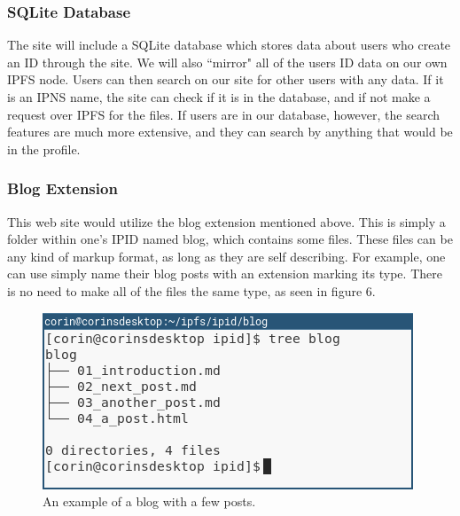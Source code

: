 \documentclass{article}
\begin{document}
\subsubsection{SQLite Database}

The site will include a SQLite database which stores data about users who create an ID through the site. We will also ``mirror" all of the users ID data on our own IPFS node. Users can then search on our site for other users with any data. If it is an IPNS name, the site can check if it is in the database, and if not make a request over IPFS for the files. If users are in our database, however, the search features are much more extensive, and they can search by anything that would be in the profile. 

\subsubsection{Blog Extension}

This web site would utilize the blog extension mentioned above. This is simply a folder within one's IPID named blog, which contains some files. These files can be any kind of markup format, as long as they are self describing. For example, one can use simply name their blog posts with an extension marking its type. There is no need to make all of the files the same type, as seen in figure 6. 

\begin{figure}[h]
  \centering
  \includegraphics[width=.75\linewidth]{resources/blog_example.png}
  \caption{An example of a blog with a few posts.}
\end{figure}
\end{document}
